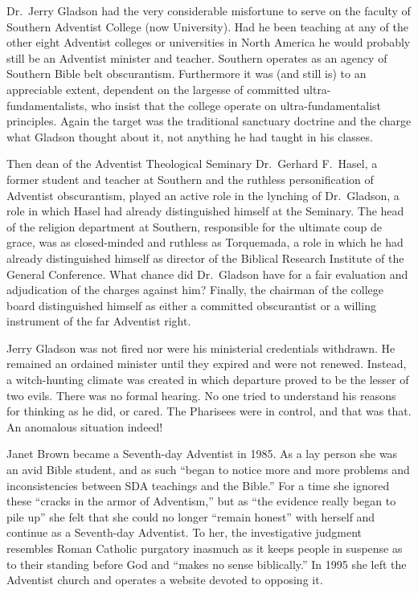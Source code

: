 Dr.\ Jerry Gladson had the very considerable misfortune to serve on the
faculty of Southern Adventist College (now University). Had he been teaching
at any of the other eight Adventist colleges or universities in North
America he would probably still be an Adventist minister and teacher.
Southern operates as an agency of Southern Bible belt obscurantism.
Furthermore it was (and still is) to an appreciable extent, dependent on the
largesse of committed ultra-fundamentalists, who insist that the college
operate on ultra-fundamentalist principles. Again the target was the
traditional sanctuary doctrine and the charge what Gladson thought about it,
not anything he had taught in his classes.

Then dean of the Adventist Theological Seminary Dr.\ Gerhard F.\ Hasel, a
former student and teacher at Southern and the ruthless personification of
Adventist obscurantism, played an active role in the lynching of Dr.\
Gladson, a role in which Hasel had already distinguished himself at the
Seminary. The head of the religion department at Southern, responsible for
the ultimate coup de grace, was as closed-minded and ruthless as Torquemada, 
a role in which he had already distinguished himself as director of the
Biblical Research Institute of the General Conference. What chance did Dr.\
Gladson have for a fair evaluation and adjudication of the charges against
him? Finally, the chairman of the college board distinguished himself as
either a committed obscurantist or a willing instrument of the far Adventist
right.

Jerry Gladson was not fired nor were his ministerial credentials withdrawn.
He remained an ordained minister until they expired and were not renewed.
Instead, a witch-hunting climate was created in which departure proved to be
the lesser of two evils. There was no formal hearing. No one tried to
understand his reasons for thinking as he did, or cared. The Pharisees were
in control, and that was that. An anomalous situation indeed!

Janet Brown became a Seventh-day Adventist in 1985. As a lay person she was
an avid Bible student, and as such ``began to notice more and more problems
and inconsistencies between SDA teachings and the Bible.'' For a time she
ignored these ``cracks in the armor of Adventism,'' but as ``the evidence
really began to pile up'' she felt that she could no longer ``remain honest''
with herself and continue as a Seventh-day Adventist. To her, the
investigative judgment resembles Roman Catholic purgatory inasmuch as it
keeps people in suspense as to their standing before God and ``makes no sense
biblically.'' In 1995 she left the Adventist church and operates a website
devoted to opposing it.

